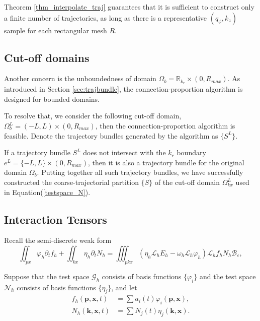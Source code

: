 \documentclass{article}
\numberwithin{equation}{section}
\begin{document}
Theorem \ref{thm_interpolate_traj} guarantees that it is sufficient to construct only a finite number of trajectories, as long as there is a representative $(q_{\phi}, k_{z})$ sample for each rectangular mesh $R$.

\subsection{Cut-off domains}
Another concern is the unboundedness of domain $\Omega_{b} = \mathbb{R}_{k_{r}} \times (0,R_{max})$. As introduced in Section \ref{sec:trajbundle}, the connection-proportion algorithm is designed for bounded domains. 

To resolve that, we consider the following cut-off domain, $ \Omega^{L}_{b} = (-L, L) \times (0, R_{max})$, then the connection-proportion algorithm is feasible. Denote the trajectory bundles generated by the algorithm as $\{S^{L}\}$. 

If a trajectory bundle $S^{L}$ does not intersect with the $k_{r}$ boundary $ e^{L} = \{-L,L\} \times (0, R_{max})$, then it is also a trajectory bundle for the original domain $\Omega_{b}$. Putting together all such trajectory bundles,  we have successfully constructed the coarse-trajectorial partition $\{ S \}$ of the cut-off domain $\Omega^{L}_{kx}$ used in Equation(\ref{testspace_N}).


\subsection{Interaction Tensors}
Recall the semi-discrete weak form
\begin{equation*}
    \iint_{px}\varphi_{h}\partial_{t}f_{h}+\iint_{kx}\eta_{h}\partial_{t}N_{h}=\iiint_{pkx}\left(\eta_{h}\mathcal{L}_{h}E_{h}-\omega_{h}\mathcal{L}_{h}\varphi_{h}\right)\mathcal{L}_{h}f_{h}N_{h}\mathcal{B}_{\varepsilon},
\end{equation*}

Suppose that the test space $\mathcal{G}_{h}$ consists of basis functions $\{ \varphi_{i} \}$ and the test space $\mathcal{N}_{h}$ consists of basis functions $\{ \eta_{j} \}$, and let
\begin{equation*}
    \begin{split}
        f_{h}(\mathbf{p},\mathbf{x},t)&=\sum a_{i}(t)\varphi_{i}(\mathbf{p},\mathbf{x}),\\
        N_{h}(\mathbf{k},\mathbf{x},t)&=\sum N_{j}(t)\eta_{j}(\mathbf{k},\mathbf{x}).
    \end{split}
\end{equation*}
\end{document}
